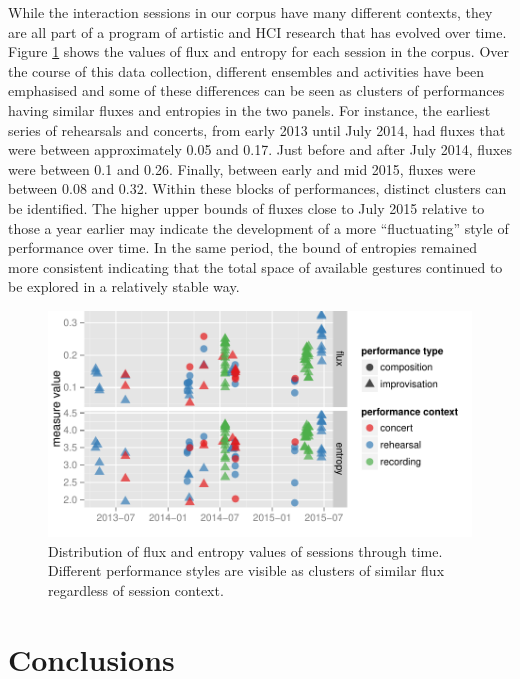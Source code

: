 \documentclass{sigchi}
\begin{document}
While the interaction sessions in our corpus have many different
contexts, they are all part of a program of artistic and HCI research
that has evolved over time. Figure \ref{fig:flux-entropy-through-time}
shows the values of flux and entropy for each session in the corpus.
Over the course of this data collection, different ensembles and
activities have been emphasised and some of these differences can be
seen as clusters of performances having similar fluxes and entropies in the
two panels. For instance, the earliest series of rehearsals and
concerts, from early 2013 until July 2014, 
had fluxes that were between approximately 0.05 and 0.17.
Just before and after July 2014, fluxes were between 0.1 and 0.26. Finally,
between early and mid 2015, fluxes were between 0.08 and 0.32. Within these 
blocks of performances, distinct clusters can be identified. The higher
upper bounds of fluxes close to July 2015 relative to those a year earlier may indicate
the development of a more ``fluctuating'' style of performance over time. In the same period, the bound
of entropies remained more consistent indicating that the total space of available gestures continued
to be explored in a relatively stable way. 

\begin{figure}
  \centering
  \includegraphics[width=\linewidth]{figures/flux-entropy-through-time}
  \caption{Distribution of flux and entropy values of sessions through time.
    Different performance styles are visible as clusters of similar
    flux regardless of session context.
    \label{fig:flux-entropy-through-time}}
\end{figure}

\section{Conclusions}
\end{document}
